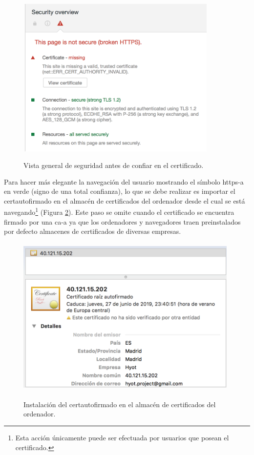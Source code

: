 \documentclass[12pt,a4paper, twoside]{report}
\begin{document}
		\begin{figure}[!ht]   
			\caption{Vista general de seguridad antes de confiar en el certificado.} 
			\begin{center} 
	 			\includegraphics[width=10cm,height=8cm]{Images/installationManual/https/overviewBefore.png} \\
				\label{fig:https_overviewBefore} 
			\end{center}  
		\end{figure}
	
	 Para hacer más elegante la navegación del usuario mostrando el símbolo \gls{https-a} en verde (signo de una total confianza), lo que se debe realizar es importar el \gls{certautofirmado} en el almacén de certificados del ordenador desde el cual se está navegando\footnote{Esta acción únicamente puede ser efectuada por usuarios que posean el certificado.} (Figura \ref{fig:https_importCert}). Este paso se omite cuando el certificado se encuentra firmado por una \gls{ca-a} ya que los ordenadores y navegadores traen preinstalados por defecto almacenes de certificados de diversas empresas. \\
		 
		\begin{figure}[!ht]   
			\caption{Instalación del \gls{certautofirmado} en el almacén de certificados del ordenador.} 
			\begin{center} 
				\includegraphics[width=11cm,height=8cm]{Images/installationManual/https/importCert.png} \\
				\label{fig:https_importCert} 
			\end{center}  
		\end{figure}
				
\end{document}
